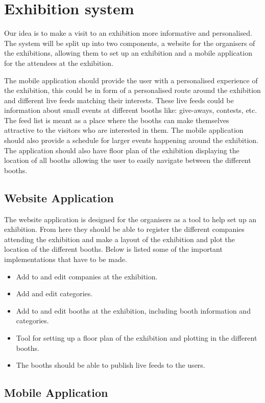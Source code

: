 \section{Exhibition system}\label{sec:exhibsystem}

Our idea is to make a visit to an exhibition more informative and personalised. The system will be split up into two components, a website for the organisers of the exhibitions, allowing them to set up an exhibition and a mobile application for the attendees at the exhibition.

The mobile application should provide the user with a personalised experience of the exhibition, this could be in form of a personalised route around the exhibition and different live feeds matching their interests. These live feeds could be information about small events at different booths like: give-aways, contests, etc. The feed list is meant as a place where the booths can make themselves attractive to the visitors who are interested in them. The mobile application should also provide a schedule for larger events happening around the exhibition. The application should also have floor plan of the exhibition displaying the location of all booths allowing the user to easily navigate between the different booths. 

\subsection*{Website Application}
The website application is designed for the organisers as a tool to help set up an exhibition. From here they should be able to register the different companies attending the exhibition and make a layout of the exhibition and plot the location of the different booths. Below is listed some of the important implementations that have to be made.
\begin{itemize}
\item Add to and edit companies at the exhibition.
\item Add and edit categories.
\item Add to and edit booths at the exhibition, including booth information and categories.
\item Tool for setting up a floor plan of the exhibition and plotting in the different booths.
\item The booths should be able to publish live feeds to the users.
\end{itemize}
\subsection*{Mobile Application}

